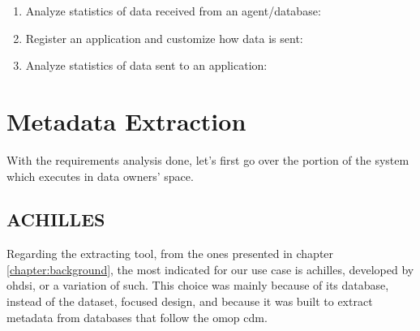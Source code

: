 \begin{enumerate}
    \item Analyze statistics of data received from an agent/database:

    \item Register an application and customize how data is sent:

    \item Analyze statistics of data sent to an application:

\end{enumerate}

\section{Metadata Extraction}

With the requirements analysis done, let's first go over the portion of the system which executes in data owners' space.

\subsection{ACHILLES}

Regarding the extracting tool, from the ones presented in chapter \ref{chapter:background}, the most indicated for our use case is \gls{achilles}, developed by \gls{ohdsi}, or a variation of such.
This choice was mainly because of its database, instead of the dataset, focused design, and because it was built to extract metadata from databases that follow the \gls{omop} \gls{cdm}.

